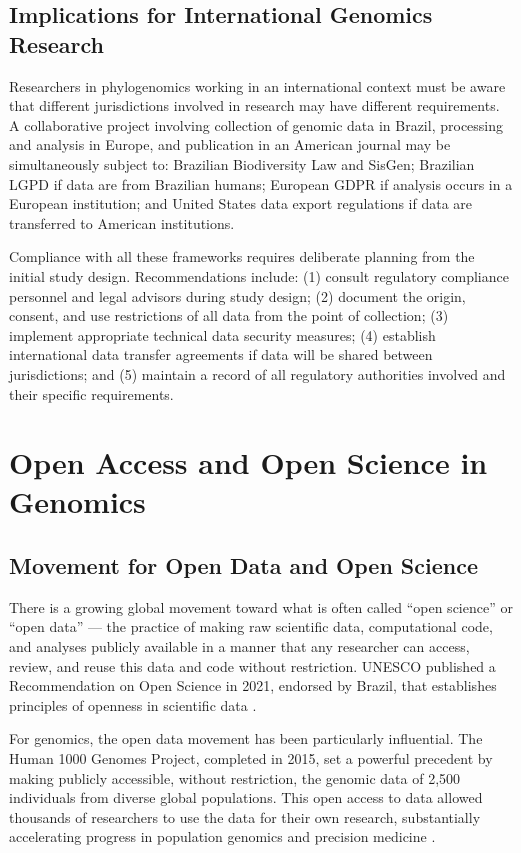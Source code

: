 \subsection{Implications for International Genomics Research}

Researchers in phylogenomics working in an international context must be aware that different jurisdictions involved in research may have different requirements. A collaborative project involving collection of genomic data in Brazil, processing and analysis in Europe, and publication in an American journal may be simultaneously subject to: Brazilian Biodiversity Law and SisGen; Brazilian LGPD if data are from Brazilian humans; European GDPR if analysis occurs in a European institution; and United States data export regulations if data are transferred to American institutions.

Compliance with all these frameworks requires deliberate planning from the initial study design. Recommendations include: (1) consult regulatory compliance personnel and legal advisors during study design; (2) document the origin, consent, and use restrictions of all data from the point of collection; (3) implement appropriate technical data security measures; (4) establish international data transfer agreements if data will be shared between jurisdictions; and (5) maintain a record of all regulatory authorities involved and their specific requirements.

\section{Open Access and Open Science in Genomics}

\subsection{Movement for Open Data and Open Science}

There is a growing global movement toward what is often called ``open science'' or ``open data'' --- the practice of making raw scientific data, computational code, and analyses publicly available in a manner that any researcher can access, review, and reuse this data and code without restriction. UNESCO published a Recommendation on Open Science in 2021, endorsed by Brazil, that establishes principles of openness in scientific data \parencite{unesco2021}.

For genomics, the open data movement has been particularly influential. The Human 1000 Genomes Project, completed in 2015, set a powerful precedent by making publicly accessible, without restriction, the genomic data of 2,500 individuals from diverse global populations. This open access to data allowed thousands of researchers to use the data for their own research, substantially accelerating progress in population genomics and precision medicine \parencite{1000genomes2015}.

